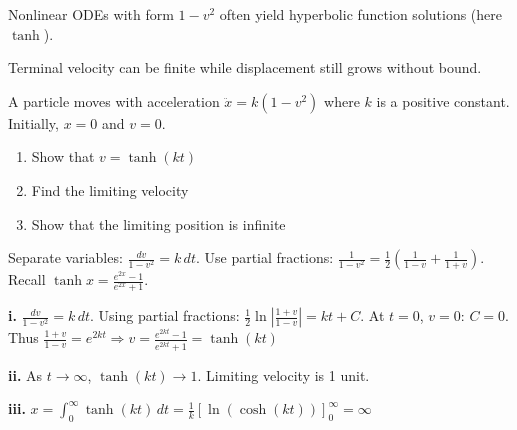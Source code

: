\begin{takeaways}
\item Nonlinear ODEs with form $1-v^2$ often yield hyperbolic function solutions (here $\tanh$).
\item Terminal velocity can be finite while displacement still grows without bound.
\end{takeaways}
\begin{problem}
A particle moves with acceleration $\ddot{x} = k(1 - v^2)$ where $k$ is a positive constant. Initially, $x = 0$ and $v = 0$.
\begin{enumerate}[label=\textbf{\roman*.}]
    \item Show that $v = \tanh(kt)$
    \item Find the limiting velocity
    \item Show that the limiting position is infinite
\end{enumerate}
\end{problem}

\begin{hint}
Separate variables: $\frac{dv}{1-v^2} = k\,dt$. Use partial fractions: $\frac{1}{1-v^2} = \frac{1}{2}\left(\frac{1}{1-v} + \frac{1}{1+v}\right)$. Recall $\tanh x = \frac{e^{2x}-1}{e^{2x}+1}$.
\end{hint}

\begin{solution}
\textbf{i.} $\frac{dv}{1-v^2} = k\,dt$. Using partial fractions: $\frac{1}{2}\ln\left|\frac{1+v}{1-v}\right| = kt + C$. At $t=0$, $v=0$: $C = 0$. Thus $\frac{1+v}{1-v} = e^{2kt} \Rightarrow v = \frac{e^{2kt}-1}{e^{2kt}+1} = \tanh(kt)$ 

\textbf{ii.} As $t \to \infty$, $\tanh(kt) \to 1$. Limiting velocity is 1 unit.

\textbf{iii.} $x = \int_0^\infty \tanh(kt)\,dt = \frac{1}{k}[\ln(\cosh(kt))]_0^\infty = \infty$ 
\end{solution}

